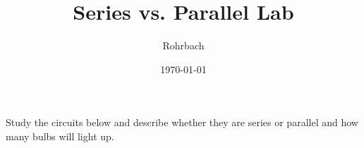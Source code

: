 \documentclass[10pt]{exam}
\title{Series vs. Parallel Lab}
\author{Rohrbach}
\date{\today}
\begin{document}
\maketitle

\begin{questions}
  \question
    Study the circuits below and describe whether they are series or parallel and how many bulbs will light up.

\end{questions}
\end{document}
